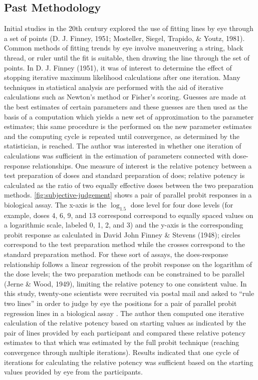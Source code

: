 \documentclass[print]{nuthesis}
\begin{document}
\hypertarget{past-methodology}{%
\subsection{Past Methodology}\label{past-methodology}}

Initial studies in the 20th century explored the use of fitting lines by eye through a set of points (D. J. Finney, 1951; Mosteller, Siegel, Trapido, \& Youtz, 1981).
Common methods of fitting trends by eye involve maneuvering a string, black thread, or ruler until the fit is suitable, then drawing the line through the set of points.
In D. J. Finney (1951), it was of interest to determine the effect of stopping iterative maximum likelihood calculations after one iteration.
Many techniques in statistical analysis are performed with the aid of iterative calculations such as Newton's method or Fisher's scoring.
Guesses are made at the best estimates of certain parameters and these guesses are then used as the basis of a computation which yields a new set of approximation to the parameter estimates; this same procedure is the performed on the new parameter estimates and the computing cycle is repeated until convergence, as determined by the statistician, is reached.
The author was interested in whether one iteration of calculations was sufficient in the estimation of parameters connected with dose-response relationships.
One measure of interest is the relative potency between a test preparation of doses and standard preparation of does; relative potency is calculated as the ratio of two equally effective doses between the two preparation methods.
\cref{fig:subjective-judgement} shows a pair of parallel probit responses in a biological assay.
The x-axis is the \(\log_{1.5}\) dose level for four dose levels (for example, doses 4, 6, 9, and 13 correspond correspond to equally spaced values on a logarithmic scale, labeled 0, 1, 2, and 3) and the y-axis is the corresponding probit response as calculated in David John Finney \& Stevens (1948); circles correspond to the test preparation method while the crosses correspond to the standard preparation method.
For these sort of assays, the does-response relationship follows a linear regression of the probit response on the logarithm of the dose levels; the two preparation methods can be constrained to be parallel (Jerne \& Wood, 1949), limiting the relative potency to one consistent value.
In this study, twenty-one scientists were recruited via postal mail and asked to ``rule two lines'' in order to judge by eye the positions for a pair of parallel probit regression lines in a biological assay .
The author then computed one iterative calculation of the relative potency based on starting values as indicated by the pair of lines provided by each participant and compared these relative potency estimates to that which was estimated by the full probit technique (reaching convergence through multiple iterations).
Results indicated that one cycle of iterations for calculating the relative potency was sufficient based on the starting values provided by eye from the participants.
\end{document}
